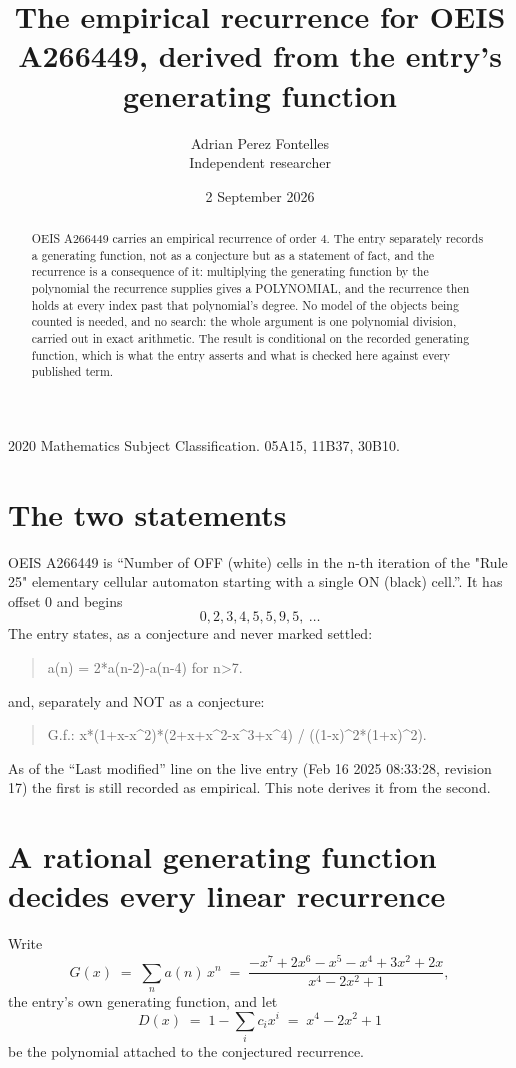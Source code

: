 \documentclass[11pt,a4paper]{article}
\title{The empirical recurrence for OEIS A266449, derived from the entry's generating function}
\author{Adrian Perez Fontelles\\ \small Independent researcher}
\date{2 September 2026}
\theoremstyle{plain}
\theoremstyle{definition}
\begin{document}
\maketitle

\begin{abstract}
OEIS A266449 carries an empirical recurrence of order $4$. The entry separately records a
generating function, not as a conjecture but as a statement of fact, and the recurrence is a
consequence of it: multiplying the generating function by the polynomial the recurrence
supplies gives a POLYNOMIAL, and the recurrence then holds at every index past that
polynomial's degree. No model of the objects being counted is needed, and no search: the
whole argument is one polynomial division, carried out in exact arithmetic. The result is
conditional on the recorded generating function, which is what the entry asserts and what is
checked here against every published term.
\end{abstract}

\noindent\small 2020 Mathematics Subject Classification. 05A15, 11B37, 30B10.\normalsize

\section{The two statements}

OEIS A266449 is ``Number of OFF (white) cells in the n-th iteration of the "Rule 25" elementary cellular automaton starting with a single ON (black) cell.''. It has offset $0$ and begins
\[
0, 2, 3, 4, 5, 5, 9, 5,\ \dots
\]
The entry states, as a conjecture and never marked settled:
\begin{quote}
a(n) = 2*a(n-2)-a(n-4) for n>7.
\end{quote}
and, separately and NOT as a conjecture:
\begin{quote}
G.f.: x*(1+x-x\^{}2)*(2+x+x\^{}2-x\^{}3+x\^{}4) / ((1-x)\^{}2*(1+x)\^{}2).
\end{quote}
As of the ``Last modified'' line on the live entry (Feb 16 2025 08:33:28, revision 17) the first is still
recorded as empirical. This note derives it from the second.

\section{A rational generating function decides every linear recurrence}

Write
\[
G(x)\;=\;\sum_{n}a(n)\,x^{n}\;=\;\frac{- x^{7} + 2 x^{6} - x^{5} - x^{4} + 3 x^{2} + 2 x}{x^{4} - 2 x^{2} + 1},
\]
the entry's own generating function, and let
\[
D(x)\;=\;1-\sum_i c_i x^{i}\;=\;x^{4} - 2 x^{2} + 1
\]
be the polynomial attached to the conjectured recurrence.
\end{document}
